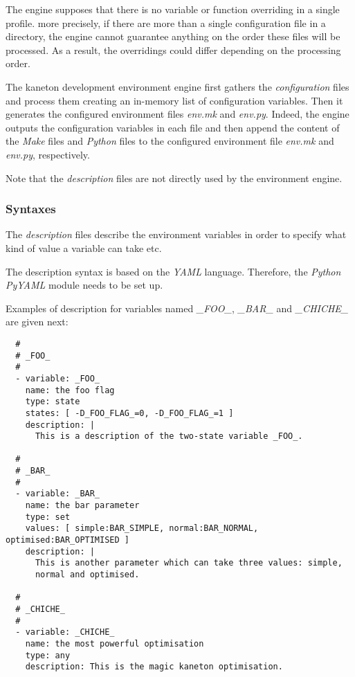 The engine supposes that there is no variable or function overriding in
a single profile. more precisely, if there are more than a single
configuration file in a directory, the engine cannot guarantee anything
on the order these files will be processed. As a result, the overridings
could differ depending on the processing order.

The kaneton development environment engine first gathers the
\textit{configuration} files and process them creating an in-memory list of
configuration variables. Then it generates the configured environment files
\textit{env.mk} and \textit{env.py}. Indeed, the engine outputs the
configuration variables in each file and then append the content of the
\textit{Make} files and \textit{Python} files to the configured environment
file \textit{env.mk} and \textit{env.py}, respectively.

Note that the \textit{description} files are not directly used by the
environment engine.

%
%

\subsubsection{Syntaxes}



The \textit{description} files describe the environment variables in order
to specify what kind of value a variable can take etc.

The description syntax is based on the \textit{YAML} language. Therefore,
the \textit{Python} \textit{PyYAML} module needs to be set up.

Examples of description for variables named \textit{\_FOO\_}, \textit{\_BAR\_}
and \textit{\_CHICHE\_} are given next:

\begin{verbatim}
  #
  # _FOO_
  #
  - variable: _FOO_
    name: the foo flag
    type: state
    states: [ -D_FOO_FLAG_=0, -D_FOO_FLAG_=1 ]
    description: |
      This is a description of the two-state variable _FOO_.

  #
  # _BAR_
  #
  - variable: _BAR_
    name: the bar parameter
    type: set
    values: [ simple:BAR_SIMPLE, normal:BAR_NORMAL, optimised:BAR_OPTIMISED ]
    description: |
      This is another parameter which can take three values: simple,
      normal and optimised.

  #
  # _CHICHE_
  #
  - variable: _CHICHE_
    name: the most powerful optimisation
    type: any
    description: This is the magic kaneton optimisation.
\end{verbatim}


